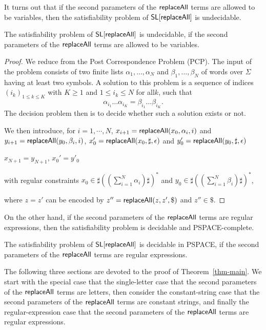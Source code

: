 It turns out that if the second parameters of the $\mathsf{replaceAll}$ terms are allowed to be variables, then the satisfiability problem of $\mathsf{SL}[\mathsf{replaceAll}]$ is undecidable.

\begin{proposition}\label{prop-und-pat-var}
The satisfiability problem of $\mathsf{SL}[\mathsf{replaceAll}]$ is undecidable, if the second parameters of the $\mathsf{replaceAll}$ terms are allowed to be variables.
\end{proposition}

\begin{proof}
	We reduce from the Post Correspondence Problem (PCP). The input of the problem consists of two finite lists $\alpha_{1},\ldots ,\alpha_{N}$ and $\beta_1,\ldots ,\beta_N$ of words over $\Sigma$ having at least two symbols. A solution to this problem is a sequence of indices $(i_{k})_{1\leq k\leq K}$ with $ K\geq 1$ and $ 1\leq i_{k}\leq N$ for all$k$, such that
	\[
	\alpha _{{i_{1}}}\ldots \alpha _{{i_{K}}}=\beta _{{i_{1}}}\ldots \beta _{{i_{K}}}.
	\]
	The decision problem then is to decide whether such a solution exists or not.
	
	We then introduce, for $i=1,\cdots, N$, 
	$x_{i+1}=\mathsf{replaceAll}(x_0, \alpha_i, i)$ and $y_{i+1}=\mathsf{replaceAll}(y_0, \beta_i, i)$, 
	$x_0'=\mathsf{replaceAll}(x_0, \sharp, \epsilon)$ and $y_0'=\mathsf{replaceAll}(y_0, \sharp, \epsilon)$
	
	$x_{N+1}=y_{N+1}$, $x_0'=y'_0$
	
	
	with regular constraints $x_0\in \sharp((\sum_{i=1}^N\alpha_i)\sharp)^*$ and $y_0\in \sharp((\sum_{i=1}^N\beta_i)\sharp)^*$,
	
	where $z=z'$ can be encoded by 
		$z''=\mathsf{replaceAll}(z, z', \$)$ and $z''\in \$$. 
\end{proof}


On the other hand, if the second parameters of the $\mathsf{replaceAll}$ terms are regular expressions, then the satisfiability problem is decidable and PSPACE-complete. 

\begin{theorem}\label{thm-main}
The satisfiability problem of $\mathsf{SL}[\mathsf{replaceAll}]$ is decidable in PSPACE, if the second parameters of the $\mathsf{replaceAll}$ terms are regular expressions.
\end{theorem}

The following three sections are devoted to the proof of Theorem~\ref{thm-main}. We start with the special case that the single-letter case that the second parameters of the $\mathsf{replaceAll}$ terms are letters, then consider the constant-string case that the second parameters of the $\mathsf{replaceAll}$ terms are constant strings, and finally the regular-expression case that the second parameters of the $\mathsf{replaceAll}$ terms are regular expressions.

